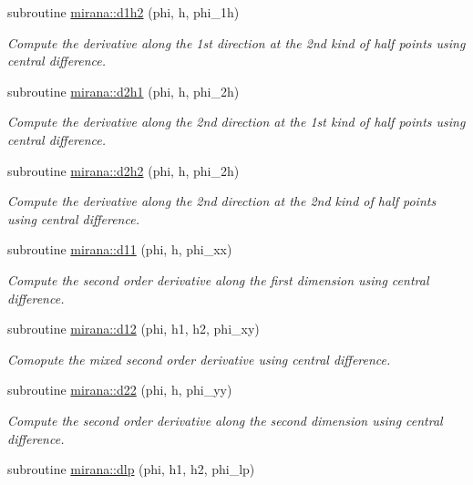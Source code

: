 \begin{DoxyCompactItemize}
subroutine \hyperlink{namespacemirana_a9d6168761271912ebfea872e9f322cdc}{mirana\+::d1h2} (phi, h, phi\+\_\+1h)
\begin{DoxyCompactList}\small\item\em Compute the derivative along the 1st direction at the 2nd kind of half points using central difference. \end{DoxyCompactList}\item 
subroutine \hyperlink{namespacemirana_a9341f957abd27c5132c557ae873055bd}{mirana\+::d2h1} (phi, h, phi\+\_\+2h)
\begin{DoxyCompactList}\small\item\em Compute the derivative along the 2nd direction at the 1st kind of half points using central difference. \end{DoxyCompactList}\item 
subroutine \hyperlink{namespacemirana_a4f47c93df57dd51d1414b2514fd1b339}{mirana\+::d2h2} (phi, h, phi\+\_\+2h)
\begin{DoxyCompactList}\small\item\em Compute the derivative along the 2nd direction at the 2nd kind of half points using central difference. \end{DoxyCompactList}\item 
subroutine \hyperlink{namespacemirana_ab9b1e7b5e38c6a020e05196b452e6d02}{mirana\+::d11} (phi, h, phi\+\_\+xx)
\begin{DoxyCompactList}\small\item\em Compute the second order derivative along the first dimension using central difference. \end{DoxyCompactList}\item 
subroutine \hyperlink{namespacemirana_ae9ee4058ea2b6238b6b745e4468f6a8e}{mirana\+::d12} (phi, h1, h2, phi\+\_\+xy)
\begin{DoxyCompactList}\small\item\em Comopute the mixed second order derivative using central difference. \end{DoxyCompactList}\item 
subroutine \hyperlink{namespacemirana_a9161b0947ddd188ac99d9246a1d81aed}{mirana\+::d22} (phi, h, phi\+\_\+yy)
\begin{DoxyCompactList}\small\item\em Compute the second order derivative along the second dimension using central difference. \end{DoxyCompactList}\item 
subroutine \hyperlink{namespacemirana_a353bce8a93046cd8fd25021634d6503e}{mirana\+::dlp} (phi, h1, h2, phi\+\_\+lp)

\end{DoxyCompactItemize}

